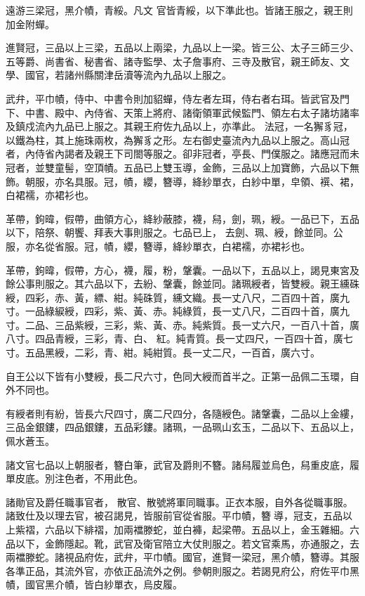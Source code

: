 \begin{pinyinscope}
 遠游三梁冠，黑介幘，青綏。凡文
 官皆青綏，以下準此也。皆諸王服之，親王則加金附蟬。



 進賢冠，三品以上三梁，五品以上兩梁，九品以上一梁。皆三公、太子三師三少、五等爵、尚書省、秘書省、諸寺監學、太子詹事府、三寺及散官，親王師友、文學、國官，若諸州縣關津岳瀆等流內九品以上服之。



 武弁，平巾幘，侍中、中書令則加貂蟬，侍左者左珥，侍右者右珥。皆武官及門下、中書、殿中、內侍省、天策上將府、諸衛領軍武候監門、領左右太子諸坊諸率及鎮戍流內九品已上服之。其親王府佐九品以上，亦準此。
 法冠，一名獬豸冠，以鐵為柱，其上施珠兩枚，為獬豸之形。左右御史臺流內九品以上服之。高山冠者，內侍省內謁者及親王下司閤等服之。卻非冠者，亭長、門僕服之。諸應冠而未冠者，並雙童髻，空頂幘。五品已上雙玉導，金飾，三品以上加寶飾，六品以下無飾。朝服，亦名具服。冠，幘，纓，簪導，絳紗單衣，白紗中單，皁領、襈、裙，白裙襦，亦裙衫也。



 革帶，鉤暐，假帶，曲領方心，絳紗蔽膝，襪，舄，劍，珮，綬。一品已下，五品以下，陪祭、朝饗、拜表大事則服之。七品已上，
 去劍、珮、綬，餘並同。公服，亦名從省服。冠，幘，纓，簪導，絳紗單衣，白裙襦，亦裙衫也。



 革帶，鉤暐，假帶，方心，襪，履，粉，鞶囊。一品以下，五品以上，謁見東宮及餘公事則服之。其六品以下，去紛、鞶囊，餘並同。諸珮綬者，皆雙綬。親王纁硃綬，四彩，赤、黃，縹、紺。純硃質，纁文織。長一丈八尺，二百四十首，廣九寸。一品綠綟綬，四彩，紫、黃、赤。純綠質，長一丈八尺，二百四十首，廣九寸。二品、三品紫綬，三彩，紫、黃、赤。純紫質。長一丈六尺，一百八十首，廣八寸。四品青綬，三彩，青、白、
 紅。純青質。長一丈四尺，一百四十首，廣七寸。五品黑綬，二彩，青、紺。純紺質。長一丈二尺，一百首，廣六寸。



 自王公以下皆有小雙綬，長二尺六寸，色同大綬而首半之。正第一品佩二玉環，自外不同也。



 有綬者則有紛，皆長六尺四寸，廣二尺四分，各隨綬色。諸鞶囊，二品以上金縷，三品金銀鏤，四品銀鏤，五品彩鏤。諸珮，一品珮山玄玉，二品以下、五品以上，佩水蒼玉。



 諸文官七品以上朝服者，簪白筆，武官及爵則不簪。諸舄履並烏色，舄重皮底，履單皮底。別注色者，不用此色。



 諸勛官及爵任職事官者，
 散官、散號將軍同職事。正衣本服，自外各從職事服。諸致仕及以理去官，被召謁見，皆服前官從省服。平巾幘，簪導，冠支，五品以上紫褶，六品以下緋褶，加兩襠滕蛇，並白褲，起梁帶。五品以上，金玉雜細。六品以下，金飾隱起。靴，武官及衛官陪立大仗則服之。若文官乘馬，亦通服之，去兩襠滕蛇。諸視品府佐，武弁，平巾幘。國官，進賢一梁冠，黑介幘，簪導。其服各準正品，其流外官，亦依正品流外之例。參朝則服之。若謁見府公，府佐平巾黑幘，國官黑介幘，皆白紗單衣，烏皮履。




\end{pinyinscope}
